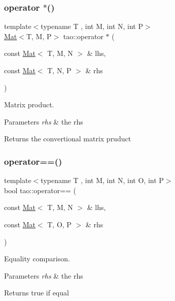\subsubsection{\texorpdfstring{operator $\ast$()}{operator *()}}
{\footnotesize\ttfamily template$<$typename T , int M, int N, int P$>$ \\
\mbox{\hyperlink{classtao_1_1_mat}{Mat}}$<$T, M, P$>$ tao\+::operator $\ast$ (\begin{DoxyParamCaption}\item[{const \mbox{\hyperlink{classtao_1_1_mat}{Mat}}$<$ T, M, N $>$ \&}]{lhs,  }\item[{const \mbox{\hyperlink{classtao_1_1_mat}{Mat}}$<$ T, N, P $>$ \&}]{rhs }\end{DoxyParamCaption})}



Matrix product. 


\begin{DoxyParams}{Parameters}
{\em rhs} & the rhs \\
\hline
\end{DoxyParams}
\begin{DoxyReturn}{Returns}
the convertional matrix pruduct 
\end{DoxyReturn}
\mbox{\label{namespacetao_a00596468f8e90608840017e4619e0bb7}} 
\subsubsection{\texorpdfstring{operator==()}{operator==()}}
{\footnotesize\ttfamily template$<$typename T , int M, int N, int O, int P$>$ \\
bool tao\+::operator== (\begin{DoxyParamCaption}\item[{const \mbox{\hyperlink{classtao_1_1_mat}{Mat}}$<$ T, M, N $>$ \&}]{lhs,  }\item[{const \mbox{\hyperlink{classtao_1_1_mat}{Mat}}$<$ T, O, P $>$ \&}]{rhs }\end{DoxyParamCaption})}



Equality comparison. 


\begin{DoxyParams}{Parameters}
{\em rhs} & the rhs \\
\hline
\end{DoxyParams}
\begin{DoxyReturn}{Returns}
true if equal 
\end{DoxyReturn}
\mbox{\label{namespacetao_a413b369fdee9e7ff22a073ef73d2e302}} 
